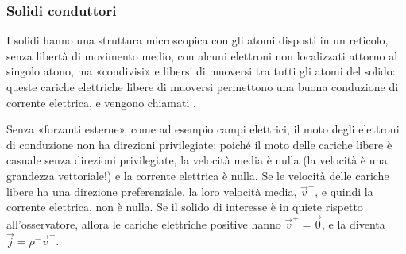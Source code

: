 \documentclass[letterpaper,10pt,italian]{jupyterBook}
\begin{document}
\subsubsection{Solidi conduttori}
\label{\detokenize{ch/electromagnetism/electric-current:solidi-conduttori}}\label{\detokenize{ch/electromagnetism/electric-current:physics-hs-electromagnetism-electric-current-solids-conductor}}
\sphinxAtStartPar
{} I solidi hanno una struttura microscopica con gli atomi disposti in un reticolo, senza libertà di movimento medio, con alcuni elettroni non localizzati attorno al singolo atono, ma «condivisi» e libersi di muoversi tra tutti gli atomi del solido: queste cariche elettriche libere di muoversi permettono una buona conduzione di corrente elettrica, e vengono chiamati .

\sphinxAtStartPar
Senza «forzanti esterne», come ad esempio campi elettrici, il moto degli elettroni di conduzione non ha direzioni privilegiate: poiché il moto delle cariche libere è casuale senza direzioni privilegiate, la velocità media è nulla (la velocità è una grandezza vettoriale!) e la corrente elettrica è nulla. Se le velocità delle cariche libere ha una direzione preferenziale, la loro velocità media, \(\vec{v}^-\), e quindi la corrente elettrica, non è nulla. Se il solido di interesse è in quiete rispetto all’osservatore, allora le cariche elettriche positive hanno \(\vec{v}^+ = \vec{0}\), e la {\hyperref[\detokenize{ch/electromagnetism/electric-current:electric-current-density-def}]{}} diventa \(\vec{j} = \rho^- \vec{v}^-\).
\end{document}
